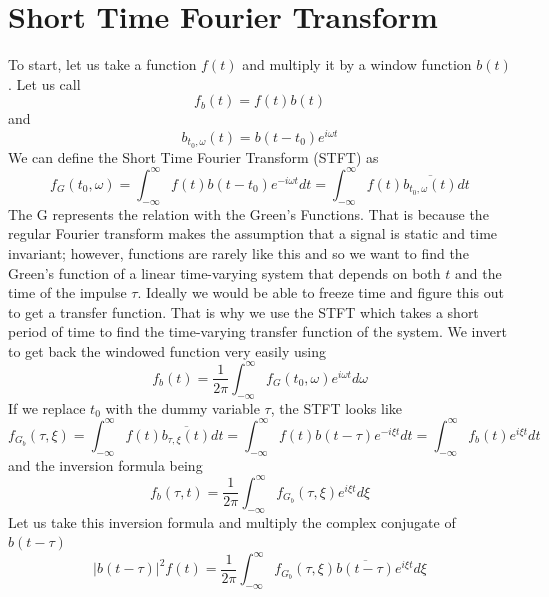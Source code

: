 \documentclass{report}
\theoremstyle{definition}
\theoremstyle{remark}
\begin{document}
\section{Short Time Fourier Transform}
To start, let us take a function $f(t)$ and multiply it by a window function $b(t)$. Let us call 
\begin{equation*}
    f_b(t)=f(t)b(t)
\end{equation*}
and \begin{equation*}
    b_{t_0,\omega}(t)=b(t-t_0)e^{i\omega t}
\end{equation*}
We can define the Short Time Fourier Transform (STFT) as 
\begin{equation*}
    f_G(t_0,\omega)=\int^\infty_{-\infty}f(t)b(t-t_0)e^{-i\omega t}dt = \int^\infty_{-\infty}f(t)\overline{b_{t_0,\omega}(t)}dt
\end{equation*}
The G represents the relation with the Green's Functions. That is because the regular Fourier transform makes the assumption that a signal is static and time invariant; however, functions are rarely like this and so we want to find the Green's function of a linear time-varying system that depends on both $t$ and the time of the impulse $\tau$. Ideally we would be able to freeze time and figure this out to get a transfer function. That is why we use the STFT which takes a short period of time to find the time-varying transfer function of the system. We invert to get back the windowed function very easily using 
\begin{equation*}
    f_b(t)=\frac{1}{2\pi}\int^\infty_{-\infty}f_G(t_0,\omega)e^{i\omega t}d\omega
\end{equation*}
If we replace $t_0$ with the dummy variable $\tau$, the STFT looks like 
\begin{equation*}
    f_{G_b}(\tau,\xi)=\int^\infty_{-\infty}f(t)\overline{b_{\tau,\xi}(t)}dt = \int^\infty_{-\infty}f(t)b(t-\tau)e^{-i\xi t}dt = \int^\infty_{-\infty}f_b(t)e^{i\xi t}dt
\end{equation*}
and the inversion formula being 
\begin{equation*}
    f_b(\tau,t)=\frac{1}{2\pi}\int^\infty_{-\infty}f_{G_b}(\tau,\xi)e^{i\xi t}d\xi
\end{equation*}
Let us take this inversion formula and multiply the complex conjugate of $b(t-\tau)$
\begin{equation*}
    |b(t-\tau)|^2f(t) =\frac{1}{2\pi}\int^\infty_{-\infty}f_{G_b}(\tau, \xi)\overline{b(t-\tau)}e^{i\xi t}d\xi
\end{equation*}
\end{document}
